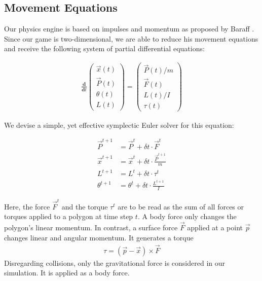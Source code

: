 \vspace{-\abovedisplayskip}
\subsection{Movement Equations}

Our physics engine is based on impulses and momentum as proposed by Baraff \cite{baraff}.
Since our game is two-dimensional, we are able to reduce his movement equations and receive the following system of partial differential equations:

\begin{align}
  \frac{\textbf{d}}{\textbf{d}{t}} 
  \left(
    \begin{array}{c}
      \vec{x}(t)\\
      \vec{P}(t)\\
      \theta(t)\\
      L(t)
    \end{array}
  \right)
  =
  \left(
    \begin{array}{c}
      {\vec{P}(t)}/{m}\\
      \vec{F}(t)\\
      L(t)/I\\
      \tau(t)
    \end{array}
  \right)
\end{align}
 
We devise a simple, yet effective symplectic Euler solver for this equation:

\begin{align}
  \vec{P}^{t+1} &= \vec{P}^{t} + \delta t \cdot \vec{F}^{t}\\
  \vec{x}^{t+1} &= \vec{x}^{t} + \delta t \cdot \frac{\vec{P}^{t+1}}{m}\\
  L^{t+1} &= L^{t} + \delta t \cdot \tau^{t}\\
  \theta^{t+1} &= \theta^{t} + \delta t \cdot \frac{L^{t+1}}{I}
\end{align}

Here, the force $\vec{F}^{t}$ and the torque $\tau^{t}$ are to be read as the sum of all forces or torques applied to a polygon at time step $t$.
A body force only changes the polygon's linear momentum.
In contrast, a surface force $\vec{F}$ applied at a point $\vec{p}$ changes linear and angular momentum.
It generates a torque
\begin{align}
  \tau = (\vec{p} - \vec{x}) \times \vec{F}\label{eq:forceToTorque}
\end{align}
Disregarding collisions, only the gravitational force is considered in our simulation.
It is applied as a body force.


